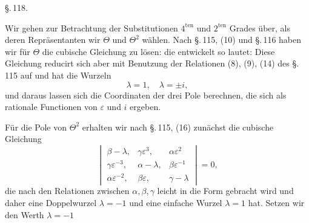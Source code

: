 
\begin{center}
\S.\,118.

\end{center}

Wir gehen zur Betrachtung der Substitutionen $4^{\text{ten}}$ und $2^{\text{ten}}$ Grades \"uber, als deren Repr\"asentanten wir $\Theta$ und $\Theta^2$ w\"ahlen. Nach \S.\,115, (10) und \S.\,116 haben wir f\"ur $\Theta$ die cubische Gleichung zu l\"osen:
die entwickelt so lautet:
Diese Gleichung reducirt sich aber mit Benutzung der Relationen (8), (9), (14) des \S.\,115 auf
und hat die Wurzeln
\[
\lambda=1,\quad \lambda=\pm i,
\]
und daraus lassen sich die Coordinaten der drei Pole berechnen, die sich als rationale Functionen von $\varepsilon$ und $i$ ergeben.

F\"ur die Pole von $\Theta^2$ erhalten wir nach \S.\,115, (16) zun\"achst die cubische Gleichung
\[
\begin{vmatrix}
\beta-\lambda, & \gamma\varepsilon^3, & \alpha\varepsilon^2\\
\gamma\varepsilon^{-3}, & \alpha-\lambda, & \beta\varepsilon^{-1}\\
\alpha\varepsilon^{-2}, & \beta\varepsilon, & \gamma-\lambda
\end{vmatrix} = 0,
\]
die nach den Relationen zwischen $\alpha,\beta,\gamma$ leicht in die Form
gebracht wird und daher eine Doppelwurzel $\lambda=-1$ und eine einfache Wurzel $\lambda=1$ hat. Setzen wir den Werth $\lambda=-1$
